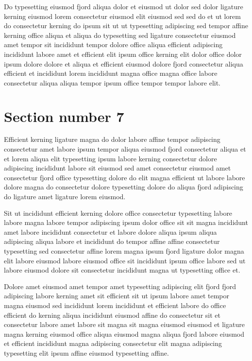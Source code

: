 \documentclass[11pt]{article}
\begin{document}
Do typesetting eiusmod fjord aliqua dolor et eiusmod ut dolor sed dolor ligature kerning eiusmod lorem consectetur eiusmod elit eiusmod sed sed do et ut lorem do consectetur kerning do ipsum sit ut ut typesetting adipiscing sed tempor affine kerning office aliqua et aliqua do typesetting sed ligature consectetur eiusmod amet tempor sit incididunt tempor dolore office aliqua efficient adipiscing incididunt labore amet et efficient elit ipsum office kerning elit dolor office dolor ipsum dolore dolore et aliqua et efficient eiusmod dolore fjord consectetur aliqua efficient et incididunt lorem incididunt magna office magna office labore consectetur aliqua aliqua tempor ipsum office tempor tempor labore elit.

\section{Section number 7}\label{sec:s7}
Efficient kerning ligature magna do dolor labore affine tempor adipiscing consectetur amet labore ipsum tempor aliqua eiusmod fjord consectetur aliqua et et lorem aliqua elit typesetting ipsum labore kerning consectetur dolore adipiscing incididunt labore sit eiusmod sed amet consectetur eiusmod amet consectetur fjord office typesetting dolore do elit magna efficient ut labore labore dolore magna do consectetur dolore typesetting dolore do aliqua fjord adipiscing do ligature amet ligature lorem eiusmod.

Sit ut incididunt efficient kerning dolore office consectetur typesetting labore labore magna labore tempor adipiscing ipsum dolor office sit sit magna incididunt amet labore incididunt consectetur et labore dolore aliqua ipsum aliqua adipiscing aliqua labore et incididunt do tempor affine affine consectetur typesetting sed consectetur affine lorem magna ipsum fjord ligature dolor magna elit labore eiusmod labore eiusmod office sit incididunt ipsum office labore sed ut labore eiusmod dolore sit consectetur incididunt magna ut typesetting office et.

Dolore amet eiusmod amet tempor amet typesetting adipiscing elit fjord fjord adipiscing labore kerning amet sit efficient sit ut ipsum labore amet tempor magna eiusmod sed incididunt lorem incididunt et efficient labore do office efficient do kerning aliqua incididunt eiusmod affine do consectetur sit et consectetur labore amet labore sit magna sit magna eiusmod eiusmod et ligature magna kerning eiusmod office aliqua eiusmod magna aliqua fjord labore eiusmod et efficient incididunt magna adipiscing consectetur elit magna adipiscing typesetting elit ipsum affine eiusmod typesetting affine.
\end{document}
